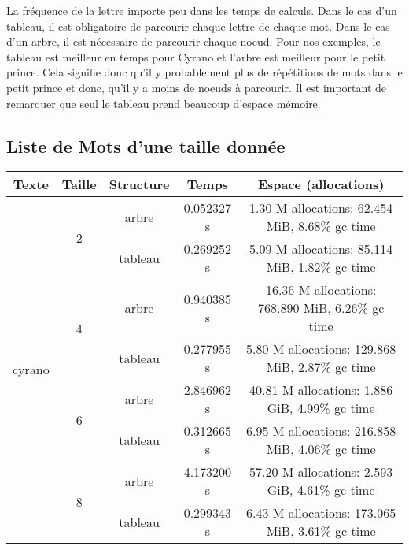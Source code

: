 \documentclass[a4paper,12pt]{article}
\begin{document}
La fréquence de la lettre importe peu dans les temps de calculs. Dans le cas d'un tableau, il est obligatoire de parcourir chaque lettre de chaque mot. Dans le cas d'un arbre, il est nécessaire de parcourir chaque noeud. Pour nos exemples, le tableau est meilleur en temps pour Cyrano et l'arbre est meilleur pour le petit prince. Cela signifie donc qu'il y probablement plus de répétitions de mots dans le petit prince et donc, qu'il y a moins de noeuds à parcourir. Il est important de remarquer que seul le tableau prend beaucoup d'espace mémoire.


\subsection{Liste de Mots d'une taille donnée} 

\begin{center}
  \begin{tabular}{|c|c|c|c|c|}
    \hline
    Texte & Taille & Structure & Temps & Espace (allocations) \\
    \hline
    \multirow{8}{*}{cyrano} & \multirow{2}{*}{2} & arbre & 0.052327 s & 1.30 M allocations: 62.454 MiB, 8.68\% gc time\\
    \cline{3-5}
    &  & tableau & 0.269252 s & 5.09 M allocations: 85.114 MiB, 1.82\% gc time\\
    \cline{2-5}
    & \multirow{2}{*}{4} & arbre & 0.940385 s & 16.36 M allocations: 768.890 MiB, 6.26\% gc time \\
    \cline{3-5}
    & & tableau & 0.277955 s & 5.80 M allocations: 129.868 MiB, 2.87\% gc time\\
    \cline{2-5}
    & \multirow{2}{*}{6} & arbre & 2.846962 s & 40.81 M allocations: 1.886 GiB, 4.99\% gc time\\
    \cline{3-5}
    & & tableau & 0.312665 s & 6.95 M allocations: 216.858 MiB, 4.06\% gc time\\
    \cline{2-5}
    & \multirow{2}{*}{8} & arbre & 4.173200 s & 57.20 M allocations: 2.593 GiB, 4.61\% gc time\\
    \cline{3-5}
    & & tableau & 0.299343 s & 6.43 M allocations: 173.065 MiB, 3.61\% gc time\\
    \hline



\end{tabular}
\end{center}
\end{document}
